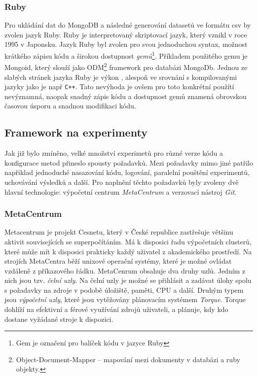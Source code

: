 \documentclass[thesis=M,czech]{FITthesis}[2012/06/26]
\begin{document}
\subsubsection*{Ruby}
Pro ukládání dat do MongoDB a následné generování datasetů ve formátu csv by zvolen jazyk Ruby. Ruby je interpretovaný skriptovací jazyk, který vznikl v roce 1995 v Japonsku.
Jazyk Ruby byl zvolen pro svou jednoduchou syntax, možnost krátkého zápisu kódu a širokou dostupnost \textit{gemů}\footnote{Gem je označení pro balíček kódu v jazyce Ruby}. Příkladem použitého gemu je Mongoid, který slouží jako ODM\footnote{Object-Document-Mapper -- mapování mezi dokumenty v databázi a ruby objekty.} framework pro databázi MongoDb.
Jednou ze slabých stránek jazyka Ruby je výkon \cite{ruby_performance}, alespoň ve srovnání s kompilovanými jazyky jako je např \texttt{C++}. Tato nevýhoda je ovšem pro toto konkrétní použítí nevýznamná, naopak snadný zápis kódu a dostupnost gemů znamená obrovskou časovou úsporu a snadnou modifikaci kódu.


\subsection{Framework na experimenty}
Jak již bylo zmíněno, velké množství experimetů pro různé verze kódu a konfigurace metod přineslo spousty požadavků. Mezi požadavky mimo jiné patřilo napřiklad jednoduché nasazování kódu, logování, paralelní pouštění experimentů, uchovávání výsledků a další. Pro naplnění těchto požadavků byly zvoleny dvě hlavní technologie: výpočetní centrum \textit{MetaCentrum} a verzovací nástroj \textit{Git}.


\subsubsection*{MetaCentrum}
Metacentrum je projekt Cesnetu, který v České republice zastřešuje většinu aktivit souvisejících se superpočítáním. Má k disposici řadu výpočetních clusterů, které může mít k disposici prakticky každý uživatel z akademického prostředí.
Na strojích MetaCentra běží unixové operační systémy, které je možné ovládat vzdáleně z příkazového řádku. MetaCenrum obsahuje dva druhy uzlů. Jedním z nich jsou tzv. \textit{čelní uzly}.
Na čelní uzly je možné se přihlásit a zadávat úlohy spolu s požadavky na zdroje v podobě úložiště, paměti, CPU a další.
Druhým typem jsou \textit{výpočetní uzly}, které jsou vytěžovány plánovacím systémem \textit{Torque}. Torque dohlíží na efektivní a férové využívání zdrojů uživateli, a plánuje, kdy kdo dostane vyžádané stroje k dispozici. \cite{metacentrum}
\end{document}
